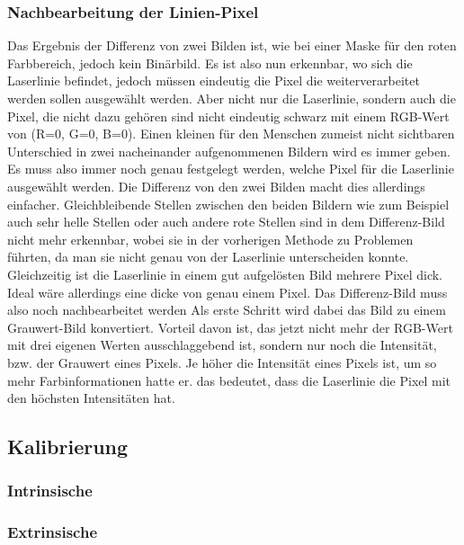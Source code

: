 		\subsubsection{Nachbearbeitung der Linien-Pixel}
		Das Ergebnis der Differenz von zwei Bilden ist, wie bei einer Maske für den roten Farbbereich, jedoch kein Binärbild. Es ist also nun erkennbar, wo sich die Laserlinie befindet, jedoch müssen eindeutig die Pixel die weiterverarbeitet werden sollen ausgewählt werden. Aber nicht nur die Laserlinie, sondern auch die Pixel, die nicht dazu gehören sind nicht eindeutig schwarz mit einem RGB-Wert von (R=0, G=0, B=0). Einen kleinen für den Menschen zumeist nicht sichtbaren Unterschied in zwei nacheinander aufgenommenen Bildern wird es immer geben. Es muss also immer noch genau festgelegt werden, welche Pixel für die Laserlinie ausgewählt werden. Die Differenz von den zwei Bilden macht dies allerdings einfacher. Gleichbleibende Stellen zwischen den beiden Bildern wie zum Beispiel auch sehr helle Stellen oder auch andere rote Stellen sind in dem Differenz-Bild nicht mehr erkennbar, wobei sie in der vorherigen Methode zu Problemen führten, da man sie nicht genau von der Laserlinie unterscheiden konnte. Gleichzeitig ist die Laserlinie in einem gut aufgelösten Bild mehrere Pixel dick. Ideal wäre allerdings eine dicke von genau einem Pixel. Das Differenz-Bild muss also noch nachbearbeitet werden \newline
		Als erste Schritt wird dabei das Bild zu einem Grauwert-Bild konvertiert. Vorteil davon ist, das jetzt nicht mehr der RGB-Wert mit drei eigenen Werten ausschlaggebend ist, sondern nur noch die Intensität, bzw. der Grauwert eines Pixels. Je höher die Intensität eines Pixels ist, um so mehr Farbinformationen hatte er. das bedeutet, dass die Laserlinie  die Pixel mit den höchsten Intensitäten hat.
	
	\subsection{Kalibrierung}
		\label{chap:kalibierung}
		\subsubsection{Intrinsische}
			\label{chap:kalibrierung_intrinsisch}
		\subsubsection{Extrinsische}
			\label{chap:kalibrierung_extrinsisch}
		
